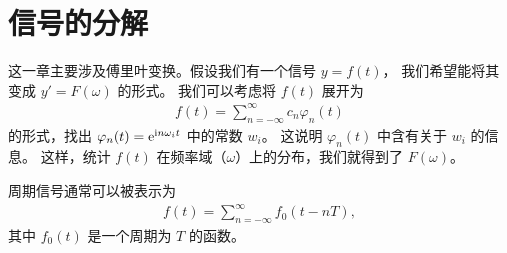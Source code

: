\section{信号的分解}

这一章主要涉及傅里叶变换。假设我们有一个信号 $y = f(t)$，
我们希望能将其变成 $y' = F(\omega)$ 的形式。
我们可以考虑将 $f(t)$ 展开为
\begin{align*}
    f(t) = \sum_{n = -\infty}^{\infty} c_n\varphi_n(t)
\end{align*}
的形式，找出 $\varphi_n(t) = \mathrm{e}^{\mathrm{i} n\omega_i t}$ 中的常数 $w_i$。
这说明 $\varphi_n(t)$ 中含有关于 $w_i$ 的信息。
这样，统计 $f(t)$ 在频率域（$\omega$）上的分布，我们就得到了 $F(\omega)$。

周期信号通常可以被表示为
\begin{align*}
    f(t) = \sum_{n = -\infty}^{\infty} f_0(t - nT),
\end{align*}
其中 $f_0(t)$ 是一个周期为 $T$ 的函数。




